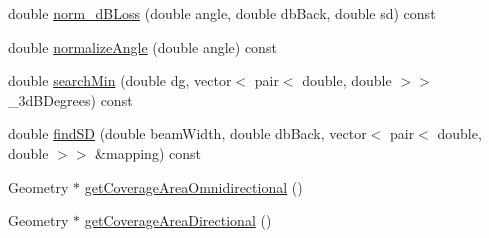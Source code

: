 \begin{DoxyCompactItemize}
\item 
double \mbox{\hyperlink{class_antenna_a8270b1a03b61af1e048650e00a129b93}{norm\+\_\+d\+B\+Loss}} (double angle, double db\+Back, double sd) const
\item 
double \mbox{\hyperlink{class_antenna_a353ae3aafbc75033c30fb96004c2b73f}{normalize\+Angle}} (double angle) const
\item 
double \mbox{\hyperlink{class_antenna_a48ef89b0d1bd313bae4ca863da1cc77e}{search\+Min}} (double dg, vector$<$ pair$<$ double, double $>$$>$ \+\_\+3d\+B\+Degrees) const
\item 
double \mbox{\hyperlink{class_antenna_affb34fcbb958e09bd48a2c3069e06ac8}{find\+SD}} (double beam\+Width, double db\+Back, vector$<$ pair$<$ double, double $>$$>$ \&mapping) const
\item 
Geometry $\ast$ \mbox{\hyperlink{class_antenna_adaca77948cf68db3348e2819264767f6}{get\+Coverage\+Area\+Omnidirectional}} ()
\item 
Geometry $\ast$ \mbox{\hyperlink{class_antenna_af5e3d353fcc340b963181514b55bf715}{get\+Coverage\+Area\+Directional}} ()
\end{DoxyCompactItemize}
